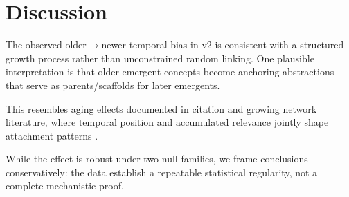 \section{Discussion}
The observed older$\rightarrow$newer temporal bias in v2 is consistent with a structured growth process rather than unconstrained random linking. One plausible interpretation is that older emergent concepts become anchoring abstractions that serve as parents/scaffolds for later emergents.

This resembles aging effects documented in citation and growing network literature, where temporal position and accumulated relevance jointly shape attachment patterns \cite{papadopoulos2012popularity,wang2013quantifying}.

While the effect is robust under two null families, we frame conclusions conservatively: the data establish a repeatable statistical regularity, not a complete mechanistic proof.
